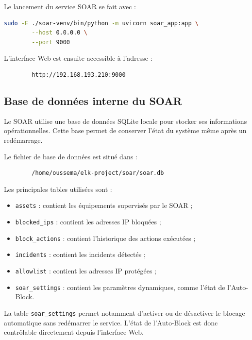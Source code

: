 \documentclass[12pt,a4paper,oneside]{report}
\begin{document}
    Le lancement du service SOAR se fait avec :
    
    \begin{lstlisting}[language=bash]
    	sudo -E ./soar-venv/bin/python -m uvicorn soar_app:app \
    	--host 0.0.0.0 \
    	--port 9000
    \end{lstlisting}
    
    L'interface Web est ensuite accessible à l'adresse :
    
    \begin{lstlisting}
    	http://192.168.193.210:9000
    \end{lstlisting}
    
    \subsection{Base de données interne du SOAR}
    
    Le SOAR utilise une base de données SQLite locale pour stocker ses informations opérationnelles. Cette base permet de conserver l'état du système même après un redémarrage.
    
    Le fichier de base de données est situé dans :
    
    \begin{lstlisting}
    	/home/oussema/elk-project/soar/soar.db
    \end{lstlisting}
    
    Les principales tables utilisées sont :
    
    \begin{itemize}
    	\item \texttt{assets} : contient les équipements supervisés par le SOAR ;
    	\item \texttt{blocked\_ips} : contient les adresses IP bloquées ;
    	\item \texttt{block\_actions} : contient l'historique des actions exécutées ;
    	\item \texttt{incidents} : contient les incidents détectés ;
    	\item \texttt{allowlist} : contient les adresses IP protégées ;
    	\item \texttt{soar\_settings} : contient les paramètres dynamiques, comme l'état de l'Auto-Block.
    \end{itemize}
    
    La table \texttt{soar\_settings} permet notamment d'activer ou de désactiver le blocage automatique sans redémarrer le service. L'état de l'Auto-Block est donc contrôlable directement depuis l'interface Web.
    
\end{document}
